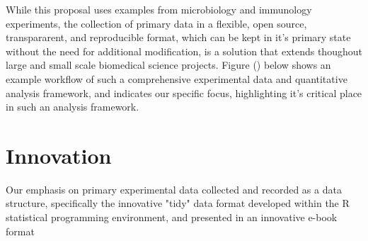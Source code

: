 \documentclass[pdftex,english,11pt,parskip=half]{scrartcl}
\begin{document}
While this proposal uses examples from microbiology and immunology experiments,
the collection of primary data in a flexible, open source, transpararent, 
and reproducible format, which can be kept in it's primary state without the 
need for additional modification, is a solution that extends thoughout
large and small scale biomedical science projects.  Figure () below shows an 
example workflow of such a comprehensive experimental data and quantitative 
analysis framework, and indicates our specific focus, highlighting it's 
critical place in such an analysis framework.



\section{Innovation} \vspace{-0.1in}

Our emphasis on primary experimental data collected and recorded as a data
structure, specifically the innovative "tidy" data format developed within the R
statistical programming environment, and presented in an innovative e-book
format
\end{document}
